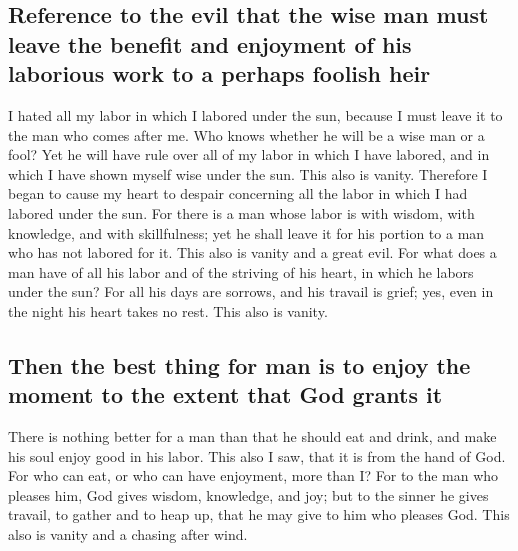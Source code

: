 \hypertarget{reference-to-the-evil-that-the-wise-man-must-leave-the-benefit-and-enjoyment-of-his-laborious-work-to-a-perhaps-foolish-heir}{%
\subsection{Reference to the evil that the wise man must leave the
benefit and enjoyment of his laborious work to a perhaps foolish
heir}\label{reference-to-the-evil-that-the-wise-man-must-leave-the-benefit-and-enjoyment-of-his-laborious-work-to-a-perhaps-foolish-heir}}

 I hated all my labor in which I labored under the sun,
because I must leave it to the man who comes after me. 
Who knows whether he will be a wise man or a fool? Yet he will have rule
over all of my labor in which I have labored, and in which I have shown
myself wise under the sun. This also is vanity. 
Therefore I began to cause my heart to despair concerning all the labor
in which I had labored under the sun.  For there is a man
whose labor is with wisdom, with knowledge, and with skillfulness; yet
he shall leave it for his portion to a man who has not labored for it.
This also is vanity and a great evil.  For what does a
man have of all his labor and of the striving of his heart, in which he
labors under the sun?  For all his days are sorrows, and
his travail is grief; yes, even in the night his heart takes no rest.
This also is vanity.

\hypertarget{then-the-best-thing-for-man-is-to-enjoy-the-moment-to-the-extent-that-god-grants-it}{%
\subsection{Then the best thing for man is to enjoy the moment to the
extent that God grants
it}\label{then-the-best-thing-for-man-is-to-enjoy-the-moment-to-the-extent-that-god-grants-it}}

 There is nothing better for a man than that he should
eat and drink, and make his soul enjoy good in his labor. This also I
saw, that it is from the hand of God.  For who can eat,
or who can have enjoyment, more than I?  For to the man
who pleases him, God gives wisdom, knowledge, and joy; but to the sinner
he gives travail, to gather and to heap up, that he may give to him who
pleases God. This also is vanity and a chasing after wind.


